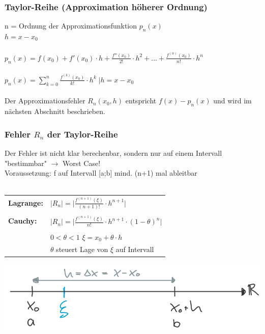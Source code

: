 			
			\subsubsection{Taylor-Reihe (Approximation höherer Ordnung)}
			n = Ordnung der Approximationsfunktion $p_n(x)$ \\
			$h = x - x_0$ \\
			\\
			$p_n(x) = f(x_0) + f'(x_0) \cdot h + \frac{f''(x_0)}{2!} \cdot h^2 + ... + \frac{f^{(n)}(x_0)}{n!} \cdot h^n$	 \\
			\\
			$p_n(x) = \sum\limits_{k=0}^{n} \frac{f^{(k)}(x_0)}{k!} \cdot h^k \; \vert h = x-x_0$\\
			\\
			Der Approximationsfehler $R_n (x_0, h)$ entspricht $f(x) - p_n(x)$ und wird im nächsten Abschnitt beschrieben.		
			
			
			\subsubsection{Fehler $R_n$ der Taylor-Reihe}
			Der Fehler ist nicht klar berechenbar, sondern nur auf einem Intervall "bestimmbar" $\rightarrow$ Worst Case! \\			
			Voraussetzung: f auf Intervall [a;b] mind. (n+1) mal ableitbar\\
			\\
			\begin{tabular}{ll}
			\textbf{Lagrange:} &  $\vert R_n \vert = \vert \frac{f^{(n+1)}(\xi)}{(n+1)!} \cdot h^{n+1} \vert $ \\
			\\
			\textbf{Cauchy:} & $\vert R_n \vert = \vert \frac{f^{(n+1)} (\xi)}{n!}  \cdot h^{n+1} \cdot (1 - \theta)^n \vert$ \\
			\\
			& $0 < \theta < 1$    $\xi = x_0 + \theta \cdot h$ \\
			& $\theta$ steuert Lage von $\xi$ auf Intervall \\
			\end{tabular}
			
		\includegraphics[width=0.7\linewidth]{Bilder/zahlenstrahl}
			
